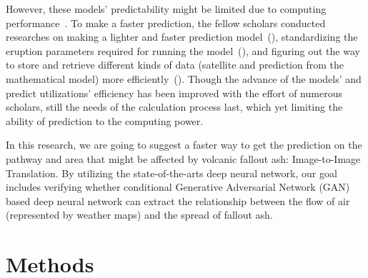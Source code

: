 \documentclass{article}
\begin{document}
\begin{doublespacing}
{  However, these models’ predictability might be limited due to computing 
  performance~\citep[p. 745-746]{Tanaka2022}. To make a faster prediction, the fellow scholars 
  conducted researches on making a lighter and faster prediction model~(\citet{Searcy1998}), 
  standardizing the eruption parameters required for running the model~(\citet[p.7]{Webley2009}), 
  and figuring out the way to store and retrieve different kinds of data (satellite and prediction 
  from the mathematical model) more efficiently~(\citet{Sorokin2016}). Though the advance of the 
  models' and predict utilizations' efficiency has been improved with the effort of numerous 
  scholars, still the needs of the calculation process last, which yet limiting the ability of 
  prediction to the computing power.

  In this research, we are going to suggest a faster way to get the prediction on the pathway and 
  area that might be affected by volcanic fallout ash: Image-to-Image Translation. By utilizing the
  state-of-the-arts deep neural network, our goal includes verifying whether conditional Generative 
  Adversarial Network (GAN) based deep neural network can extract the relationship between the flow 
  of air (represented by weather maps) and the spread of fallout ash.
}

\section{Methods}  %
\fontsize{11pt}{11pt} 
\end{doublespacing}
\end{document}
